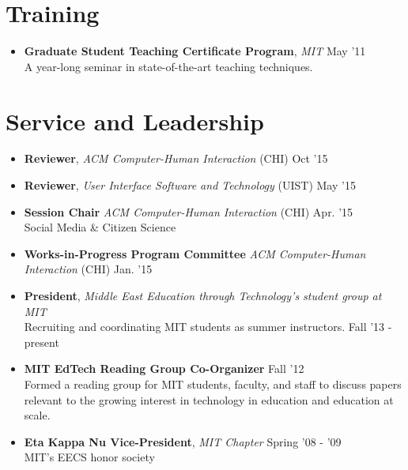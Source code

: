 \documentclass[margin]{res}
\begin{document}
\begin{resume}
\section{Training}
\begin{itemize}[leftmargin=*]
\item {\bf Graduate Student Teaching Certificate Program}, {\it MIT} \hfill May '11 \\ A year-long seminar in state-of-the-art teaching techniques.
\end{itemize}

\section{Service and Leadership}

                \begin{itemize}[leftmargin=*] %
\item {\bf Reviewer}, {\it ACM Computer-Human Interaction} (CHI) \hfill Oct '15 
\item {\bf Reviewer}, {\it User Interface Software and Technology} (UIST) \hfill May '15 
\item {\bf Session Chair} {\it ACM Computer-Human Interaction} (CHI) \hfill Apr. '15 \\
Social Media \& Citizen Science
\item {\bf Works-in-Progress Program Committee} {\it ACM Computer-Human Interaction} (CHI)  \hfill Jan. '15 


\item {\bf President}, {\it Middle East Education through Technology's student group at MIT} \\ Recruiting and coordinating MIT students as summer instructors. \hfill Fall '13 - present %

		\item {\bf MIT EdTech Reading Group Co-Organizer} \hfill Fall '12 \\ Formed a reading group for MIT students, faculty, and staff to discuss papers relevant to the growing interest in technology in education and education at scale.

                \item {\bf Eta Kappa Nu Vice-President}, {\it MIT Chapter} \hfill Spring '08 - '09 \\ MIT's EECS honor society 



\end{itemize}
\end{resume}
\end{document}
